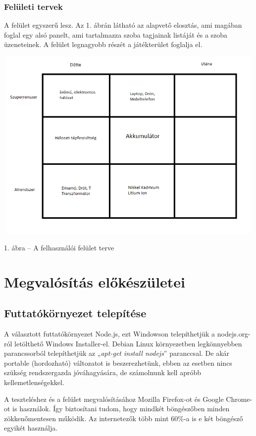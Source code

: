 \documentclass[bibliography=totocnumbered]{article}
\begin{document}
\subsubsection{Felületi tervek}

A felület egyszerű lesz. Az 1. ábrán látható az alapvető elosztás, ami
magában foglal egy alsó panelt, ami tartalmazza szoba tagjainak listáját
és a szoba üzeneteinek. A felület legnagyobb részét a játékterület
foglalja el.

\includegraphics[width=5.375in,height=3.73238in]{media/image1.png}

1. ábra -- A felhasználói felület terve


\section{Megvalósítás
előkészületei}


\subsection{Futtatókörnyezet
telepítése}

A választott futtatókörnyezet Node.js, ezt Windowson telepíthetjük a
nodejs.org-ról letölthető Windows Installer-el. Debian Linux
környezetben legkönnyebben parancssorból telepíthetjük az „\emph{apt-get
install nodejs}'' paranccsal. De akár portable (hordozható) változatot
is beszerezhetünk, ebben az esetben nincs szükség rendszergazda
jóváhagyására, de számolnunk kell apróbb kellemetlenségekkel.

A teszteléshez és a felület megvalósításához Mozilla Firefox-ot és
Google Chrome-ot is használok. Így biztosítani tudom, hogy mindkét
böngészőben minden zökkenőmentesen működik. Az internetezők több mint
60\%-a is e két böngésző egyikét használja.
\end{document}
